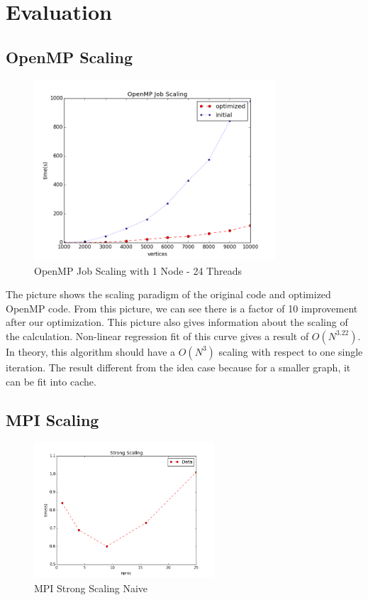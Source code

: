 \section{Evaluation}\label{sec:evaluation}
\subsection{OpenMP Scaling}

\begin{figure}[H]
    \centering
    \includegraphics[width=0.8\textwidth]{figs/MPI_job_scaling.png}
    \caption{OpenMP Job Scaling with 1 Node - 24 Threads}
\end{figure}

The picture shows the scaling paradigm of the original code and optimized OpenMP code. From this picture, we can
see there is a factor of 10 improvement after our optimization. This picture also gives information about the
scaling of the calculation. Non-linear regression fit of this curve gives a result of $O(N^{3.22})$. \\

In theory, this algorithm should have a $O(N^{3})$ scaling with respect to one single iteration. The result
different from the idea case because for a smaller graph, it can be fit into cache.

\subsection{MPI Scaling}

\begin{figure}[H]
    \centering
    \includegraphics[width=0.6\textwidth]{figs/MPI_strong_scaling.png}
    \caption{MPI Strong Scaling Naive}
\end{figure}

